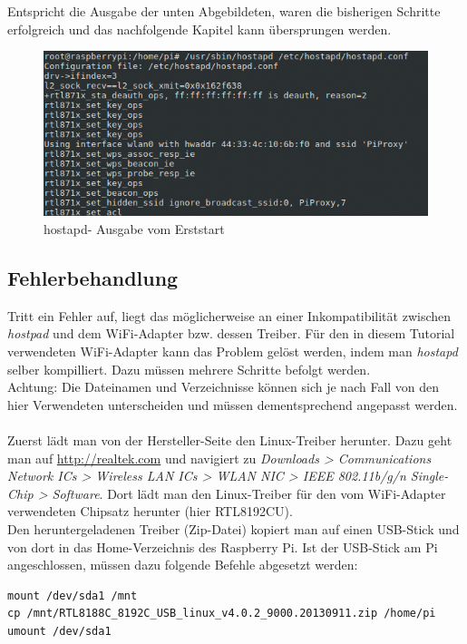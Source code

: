 Entspricht die Ausgabe der unten Abgebildeten, waren die bisherigen Schritte erfolgreich und das nachfolgende Kapitel kann übersprungen werden.

\begin{figure}[H]
\centering
\includegraphics[scale=0.7]{images/hostapd_firststart}
\caption{hostapd- Ausgabe vom Erststart}
\end{figure}

\subsection{Fehlerbehandlung}
Tritt ein Fehler auf, liegt das möglicherweise an einer Inkompatibilität zwischen \textit{hostpad} und dem WiFi-Adapter bzw. dessen Treiber. Für den in diesem Tutorial verwendeten WiFi-Adapter kann das Problem gelöst werden, indem man \textit{hostapd} selber kompilliert. Dazu müssen mehrere Schritte befolgt werden.
\\
Achtung: Die Dateinamen und Verzeichnisse können sich je nach Fall von den hier Verwendeten unterscheiden und müssen dementsprechend angepasst werden.
\\
\\
Zuerst lädt man von der Hersteller-Seite den Linux-Treiber herunter. Dazu geht man auf \url{http://realtek.com} und navigiert zu \textit{Downloads > Communications Network ICs > Wireless LAN ICs > WLAN NIC > IEEE 802.11b/g/n Single-Chip > Software}. Dort lädt man den Linux-Treiber für den vom  WiFi-Adapter verwendeten Chipsatz herunter (hier RTL8192CU).
\\
Den heruntergeladenen Treiber (Zip-Datei) kopiert man auf einen USB-Stick und von dort in das Home-Verzeichnis des Raspberry Pi. Ist der USB-Stick am Pi angeschlossen, müssen dazu folgende Befehle abgesetzt werden:

\begin{lstlisting}
mount /dev/sda1 /mnt
cp /mnt/RTL8188C_8192C_USB_linux_v4.0.2_9000.20130911.zip /home/pi
umount /dev/sda1
\end{lstlisting} 

